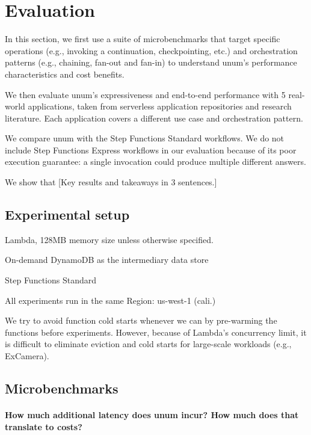 \section{Evaluation}\label{sec:eval}

In this section, we first use a suite of microbenchmarks that target specific
operations (e.g., invoking a continuation, checkpointing, etc.) and orchestration
patterns (e.g., chaining, fan-out and fan-in) to understand unum's performance
characteristics and cost benefits.

We then evaluate unum's expressiveness and end-to-end performance with 5
real-world applications, taken from serverless application repositories and
research literature. Each application covers a different use case and
orchestration pattern.

We compare unum with the Step Functions Standard workflows. We do not include
Step Functions Express workflows in our evaluation because of its poor
execution guarantee: a single invocation could produce multiple different
answers.

We show that [Key results and takeaways in 3 sentences.]

\subsection{Experimental setup}

Lambda, 128MB memory size unless otherwise specified.

On-demand DynamoDB as the intermediary data store

Step Functions Standard

All experiments run in the same Region: us-west-1 (cali.)

We try to avoid function cold starts whenever we can by pre-warming the
functions before experiments. However, because of Lambda's concurrency limit,
it is difficult to eliminate eviction and cold starts for large-scale
workloads (e.g., ExCamera).

\subsection{Microbenchmarks}


\paragraph{How much additional latency does unum incur? How much does that
translate to costs?}

